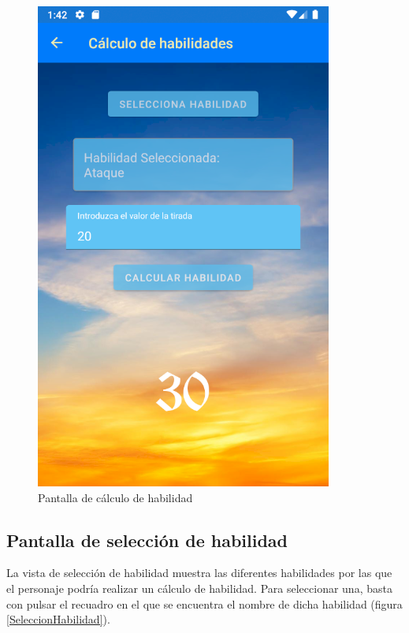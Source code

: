 \begin{figure}[H]
    \centering
    \includegraphics[scale=0.3]{Figures/Capturas/CalcularHabilidad.png}
    \caption{Pantalla de cálculo de habilidad}
    \label{CalculoHabilidad}    
\end{figure}

\subsection{Pantalla de selección de habilidad}
La vista de selección de habilidad muestra las diferentes habilidades por las que el personaje podría 
realizar un cálculo de habilidad. Para seleccionar una, basta con pulsar el recuadro en el que se encuentra 
el nombre de dicha habilidad (figura \ref*{SeleccionHabilidad}).

